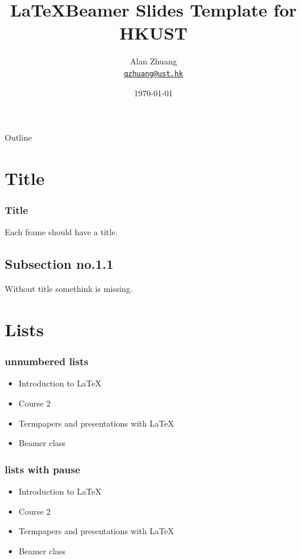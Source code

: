 \documentclass{beamer}
\title{\LaTeX Beamer Slides Template for HKUST}
\author{Alan Zhuang\\
\href{mailto:qzhuang@ust.hk}{\nolinkurl{qzhuang@ust.hk}}\\
}
\date{\today}
\begin{document}


\frame{\titlepage}

\section[Outline]{}
\begin{frame}{Outline}
  \tableofcontents
\end{frame}

\section{Title} 
\begin{frame}\frametitle{Title} 
	Each frame should have a title.
\end{frame}
\subsection{Subsection no.1.1  }
\begin{frame} 
	Without title somethink is missing. 
\end{frame}


\section{Lists} 
\begin{frame}\frametitle{unnumbered lists}
	\begin{itemize}
		\item Introduction to  \LaTeX  
		\item Course 2 
		\item Termpapers and presentations with \LaTeX 
		\item Beamer class
	\end{itemize} 
\end{frame}

\begin{frame}\frametitle{lists with pause}
	\begin{itemize}
		\item Introduction to  \LaTeX \pause 
		\item Course 2 \pause 
		\item Termpapers and presentations with \LaTeX \pause 
		\item Beamer class
	\end{itemize} 
\end{frame}
\end{document}
